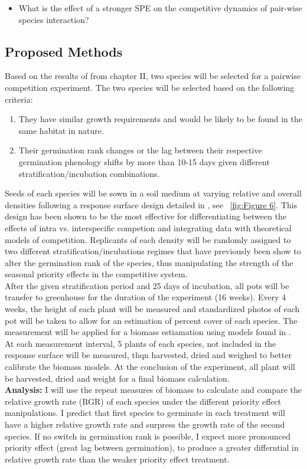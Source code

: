 \documentclass{article}\usepackage[]{graphicx}\usepackage[]{color}
\begin{document}
\begin{itemize}
\item What is the effect of a stronger SPE on the competitive dynamics of pair-wise species interaction?
\end{itemize}
\subsection*{Proposed Methods}
\indent Based on the results of from chapter II, two species will be selected for a pairwise competition experiment. The two species will be selected based on the following criteria:
\begin{enumerate}
\item They have similar growth requirements and would be likely to be found in the same habitat in nature.
\item Their germination rank changes or the lag between their respective germination phenology shifts by more than 10-15 days given different stratification/incubation combinations.
\end{enumerate}
Seeds of each species will be sown in a soil medium at varying relative and overall densities following a response surface design detailed in \cite{Inouye2001}, see ~\ref{fig:Figure 6}. This design has been shown to be the most effective for differentiating between the effects of intra vs. interspecific competion and integrating data with theoretical models of competition.  Replicants of each density will be randomly assigned to two different stratification/incubations regimes that have previously been show to alter the germination rank of the species, thus manipulating the strength of the seasonal priority effects in the competitive system.\\
After the given stratification period and 25 days of incubation, all pots will be transfer to greenhouse for the duration of the experiment (16 weeks). Every 4 weeks, the height of each plant will be measured and standardized photos of each pot will be taken to allow for an estimation of percent cover of each species. The measurement will be applied for a biomass estiamation using models found in \citet{Axmanova2012}. At each measurement interval, 5 plants of each species, not included in the response surface will be measured, thqn harvested, dried and weighed to better calibrate the biomass models. At the conclusion of the experiment, all plant will be harvested, dried and weight for a final biomass calculation.\\
\textbf{Analysis:} I will use the repeat measures of biomass to calculate and compare the relative growth rate (RGR) \citep{Connolly2005} of each species under the different priority effect manipulations. I predict that first species to germinate in each treatment will have a higher relative growth rate and surpress the growth rate of the second species. If no switch in germination rank is possible, I expect more pronounced priority effect (great lag between germination), to produce a greater differntial in relative growth rate than the weaker priority effect treatment.\\  
\end{document}
